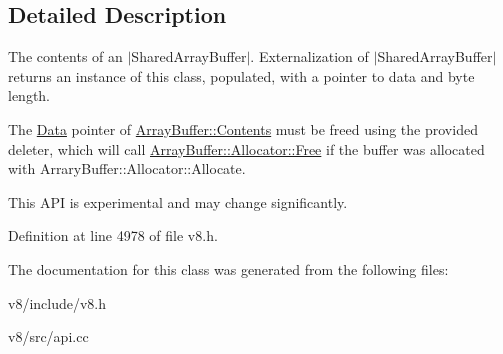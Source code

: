 \subsection{Detailed Description}
The contents of an $\vert$\+Shared\+Array\+Buffer$\vert$. Externalization of $\vert$\+Shared\+Array\+Buffer$\vert$ returns an instance of this class, populated, with a pointer to data and byte length.

The \mbox{\hyperlink{classv8_1_1Data}{Data}} pointer of \mbox{\hyperlink{classv8_1_1ArrayBuffer_1_1Contents}{Array\+Buffer\+::\+Contents}} must be freed using the provided deleter, which will call \mbox{\hyperlink{classv8_1_1ArrayBuffer_1_1Allocator_a419f59d2a103a5a8863809d7977c9cd8}{Array\+Buffer\+::\+Allocator\+::\+Free}} if the buffer was allocated with Arrary\+Buffer\+::\+Allocator\+::\+Allocate.

This A\+PI is experimental and may change significantly. 

Definition at line 4978 of file v8.\+h.



The documentation for this class was generated from the following files\+:\begin{DoxyCompactItemize}
\item 
v8/include/v8.\+h\item 
v8/src/api.\+cc\end{DoxyCompactItemize}

